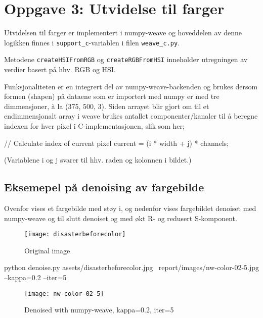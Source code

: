 \section*{Oppgave 3: Utvidelse til farger}

Utvidelsen til farger er implementert i numpy-weave og hoveddelen av denne logikken finnes i \verb;support_c;-variablen i filen \verb;weave_c.py;.

Metodene \verb;createHSIFromRGB; og \verb;createRGBFromHSI; inneholder utregningen av verdier basert på hhv. RGB og HSI.

Funksjonaliteten er en integrert del av numpy-weave-backenden og brukes dersom formen (shapen) på dataene som er importert med numpy er med tre dimmensjoner, à la (375, 500, 3). Siden arrayet blir gjort om til et endimmensjonalt array i weave brukes antallet componenter/kanaler til å beregne indexen for hver pixel i C-implementasjonen, slik som her;

// Calculate index of current pixel
current = (i * width + j) * channels;

(Variablene i og j svarer til hhv. raden og kolonnen i bildet.)

\pagebreak

\subsection*{Eksemepel på denoising av fargebilde}

Ovenfor vises et fargebilde med støy i, og nedenfor vises fargebildet denoiset med numpy-weave og til slutt denoiset og med økt R- og redusert S-komponent.

\pagebreak

\begin{figure}[!h]
\centering
\texttt{[image: disasterbeforecolor]}
\caption{Original image}
\end{figure}

\pagebreak

python denoise.py assets/disasterbeforecolor.jpg \
report/images/nw-color-02-5.jpg --kappa=0.2 --iter=5

\begin{figure}[!h]
\centering
\texttt{[image: nw-color-02-5]}
\caption{Denoised with numpy-weave, kappa=0.2, iter=5}
\end{figure}

\pagebreak